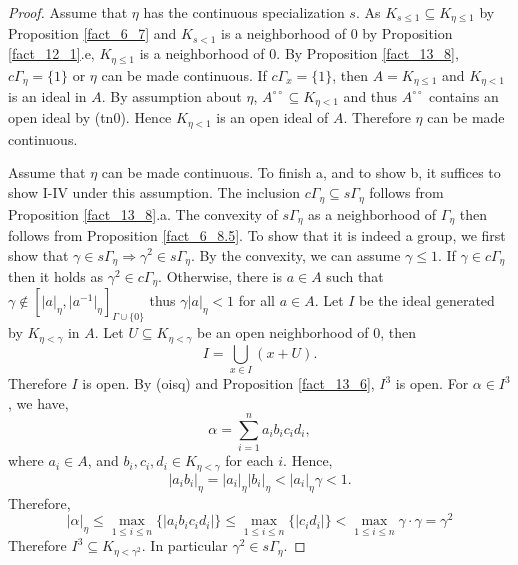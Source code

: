 \documentclass[10pt]{article}
\numberwithin{equation}{section}
\theoremstyle{definition}
\newcommand{\ab}[1]{\vert #1 \vert}
\newcommand{\cGamma}[0]{c\Gamma}
\newcommand{\dcirc}[0]{{\circ\circ}}
\begin{document}
\begin{proof}
    Assume that $\eta$ has the continuous specialization $s$. As $K_{s\leq 1}\subseteq K_{\eta\leq 1}$ by Proposition \ref{fact_6_7} and $K_{s<1}$ is a neighborhood of $0$ by Proposition \ref{fact_12_1}.e, $K_{\eta\leq1}$ is a neighborhood of $0$. By Proposition \ref{fact_13_8}, $\cGamma_\eta=\{1\}$ or $\eta$ can be made continuous.
    If $\cGamma_x=\{1\}$, then $A=K_{\eta\leq1}$ and $K_{\eta<1}$ is an ideal in $A$. By assumption about $\eta$, $A^\dcirc\subseteq K_{\eta<1}$ and thus $A^\dcirc$ contains an open ideal by (tn0). Hence $K_{\eta<1}$ is an open ideal of $A$. Therefore $\eta$ can be made continuous.
    \par Assume that $\eta$ can be made continuous. To finish a, and to show b, it suffices to show I-IV under this assumption.
    The inclusion $\cGamma_\eta \subseteq s\Gamma_\eta$ follows from Proposition \ref{fact_13_8}.a. The convexity of $s\Gamma_\eta$ as a neighborhood of $\Gamma_\eta$ then follows from Proposition \ref{fact_6_8.5}.
    To show that it is indeed a group, we first show that $\gamma\in s\Gamma_\eta\Rightarrow \gamma^2\in s\Gamma_\eta$. By the convexity, we can assume $\gamma\leq 1$. If $\gamma\in\cGamma_\eta$ then it holds as $\gamma^2\in\cGamma_\eta$. Otherwise, there is $a\in A$ such that $\gamma\not\in[\ab{a}_\eta,\ab{a^{-1}}_\eta]_{\Gamma\cup\{0\}}$ thus $\gamma\ab{a}_\eta<1$ for all $a\in A$.
    Let $I$ be the ideal generated by $K_{\eta<\gamma}$ in $A$. Let $U\subseteq K_{\eta<\gamma}$ be an open neighborhood of $0$, then
    \begin{equation*}
        I = \bigcup_{x\in I}(x+U).
    \end{equation*}
    Therefore $I$ is open. By (oisq) and Proposition \ref{fact_13_6}, $I^3$ is open. For $\alpha\in I^3$, we have,
    \begin{equation*}
        \alpha = \sum_{i=1}^n a_ib_ic_id_i,
    \end{equation*}
    where $a_i\in A$, and $b_i,c_i,d_i\in K_{\eta<\gamma}$ for each $i$. Hence,
    \begin{equation*}
        \ab{a_ib_i}_\eta=\ab{a_i}_\eta\ab{b_i}_\eta <\ab{a_i}_\eta\gamma<1.
    \end{equation*}
    Therefore,
    \begin{equation*}
    \ab{\alpha}_\eta \leq \max_{1\leq i\leq n}\{\ab{a_ib_ic_id_i}\}\leq \max_{1\leq i\leq n}\{\ab{c_id_i}\} <\max_{1\leq i\leq n}\gamma\cdot\gamma=\gamma^2
    \end{equation*}
    Therefore $I^3\subseteq K_{\eta<\gamma^2}$. In particular $\gamma^2\in s\Gamma_\eta$.

\end{proof}
\end{document}
